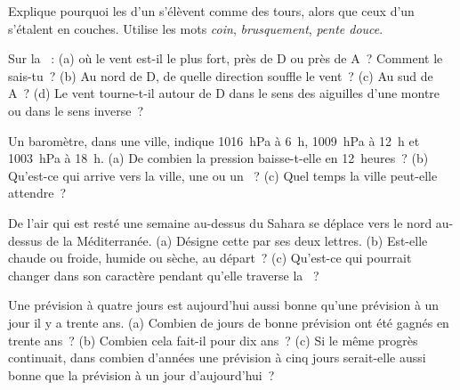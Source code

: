 \begin{exercise}[$\star\star$]\label{exo:g8:fronts-and-weather-maps:6}
Explique pourquoi les  d'un  s'élèvent comme des tours,
alors que ceux d'un  s'étalent en couches. Utilise les mots
\emph{coin}, \emph{brusquement}, \emph{pente douce}.
\end{exercise}

\begin{exercise}[$\star\star$]\label{exo:g8:fronts-and-weather-maps:7}
Sur la  ~: (a) où le vent est-il le plus fort, près de D
ou près de A~? Comment le sais-tu~? (b) Au nord de D, de quelle direction
souffle le vent~? (c) Au sud de A~? (d) Le vent tourne-t-il autour de D
dans le sens des aiguilles d'une montre ou dans le sens inverse~?
\end{exercise}

\begin{exercise}[$\star\star$]\label{exo:g8:fronts-and-weather-maps:8}
Un baromètre, dans une ville, indique \qty{1016}{hPa} à 6~h,
\qty{1009}{hPa} à 12~h et \qty{1003}{hPa} à 18~h. (a) De combien la
pression baisse-t-elle en 12~heures~? (b) Qu'est-ce qui arrive vers la
ville, une  ou un ~? (c) Quel temps la ville
peut-elle attendre~?
\end{exercise}

\begin{exercise}[$\star\star$]\label{exo:g8:fronts-and-weather-maps:9}
De l'air qui est resté une semaine au-dessus du Sahara se déplace vers le
nord au-dessus de la  Méditerranée. (a) Désigne cette  par
ses deux lettres. (b) Est-elle chaude ou froide, humide ou sèche, au
départ~? (c) Qu'est-ce qui pourrait changer dans son caractère pendant
qu'elle traverse la ~?
\end{exercise}

\begin{exercise}[$\star\star$]\label{exo:g8:fronts-and-weather-maps:10}
Une prévision à quatre jours est aujourd'hui aussi bonne qu'une prévision
à un jour il y a trente ans. (a) Combien de jours de bonne prévision
ont été gagnés en trente ans~? (b) Combien cela fait-il pour dix ans~?
(c) Si le même progrès continuait, dans combien d'années une prévision à
cinq jours serait-elle aussi bonne que la prévision à un jour
d'aujourd'hui~?
\end{exercise}

